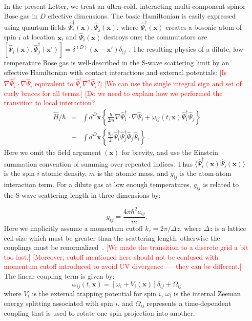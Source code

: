 \documentclass[aps,prl,twocolumn,showpacs,amsmath,amssymb,superscriptaddress]{revtex4-1}
\newcommand{\remark}[1]{\textcolor{red}{{[}#1{]}}}
\begin{document}
In the present Letter, we treat an ultra-cold,
interacting multi-component spinor Bose gas in $D$ effective dimensions.
The basic Hamiltonian is easily expressed using quantum fields
$\widehat{\Psi}_{i}^{\dagger}({\mathbf{x}}),\widehat{\Psi}_{j}({\mathbf{x}})$,
where $\widehat{\Psi}_{i}^{\dagger}({\mathbf{x}})$ creates a bosonic atom of spin $i$
at location $\mathbf{x}$, and $\widehat{\Psi}_{i}({\mathbf{x}})$ destroys one;
the commutators are
$[\widehat{\Psi}_{i}(\mathbf{x}),\widehat{\Psi}_{j}^{\dagger}(\mathbf{x}')] =
\delta^{(D)}(\mathbf{x}-\mathbf{x}')\delta_{ij}\,\,.$
The resulting physics of a dilute, low-temperature Bose gas
is well-described in the S-wave scattering limit by an effective Hamiltonian
with contact interactions and external potentials:
	\remark{Is $\nabla \widehat{\Psi}_{i}^{\dagger} \cdot \nabla \widehat{\Psi}_{i}$
	equivalent to $\widehat{\Psi}_{i}^{\dagger} \nabla^2 \widehat{\Psi}_{i}$?}
	\remark{We can use the single integral sign and set of curly braces for all terms.}
	\remark{Do we need to explain how we performed the transition to local interaction?}
\begin{eqnarray}
	\widehat{H}/\hbar & = & \int d^{D}{\mathbf{x}} \left\{
		\frac{\hbar}{2m}{\nabla} \widehat{\Psi}_{i}^{\dagger} \cdot {\nabla} \widehat{\Psi}_{i} +
		\omega_{ij}(t,{\mathbf{x}}) \widehat{\Psi}_{i}^{\dagger} \widehat{\Psi}_{j}
	\right\} \nonumber \\
	& + & \int d^{D}{\mathbf{x}} \left\{
		\frac{g_{ij}}{2} \widehat{\Psi}_{i}^{\dagger} \widehat{\Psi}_{j}^{\dagger}
		\widehat{\Psi}_{j} \widehat{\Psi}_{i}
	\right\} \,\,.
\end{eqnarray}
Here we omit the field argument $({\mathbf{x}})$ for brevity,
and use the Einstein summation convention of summing over repeated indices.
Thus $\langle \widehat{\Psi}_{i}^{\dagger}({\mathbf{x}}) \widehat{\Psi}_{i}({\mathbf{x}}) \rangle$
is the spin $i$ atomic density, $m$ is the atomic mass,
and $g_{ij}$ is the atom-atom interaction term.
For a dilute gas at low enough temperatures,
$g_{ij}$ is related to the S-wave scattering length in three dimensions by:

\begin{equation}
	g_{ij}=\frac{4\pi\hbar^{2}a_{ij}}{m}.
\end{equation}
Here we implicitly assume a momentum cutoff $k_{c}=2\pi/\Delta z$,
where $\Delta z$ is a lattice cell-size which must be greater than the scattering length,
otherwise the couplings must be renormalized~\cite{Sinatra2002}.
	\remark{We made the transition to a discrete grid a bit too fast.}
	\remark{Moreover, cutoff mentioned here should not be confused with momentum cutoff
	introduced to avoid UV divergence~--- they can be different.}
The linear coupling term is given by:
\begin{equation}
	\omega_{ij}(t,{\mathbf{x}}) = \left[
		\omega_{i}+V_{i} \left( \mathbf{x} \right)
	\right] \delta_{ij} + \Omega_{ij}
\end{equation}
where $V_{i}$ is the external trapping potential for spin $i$,
$\omega_{i}$ is the internal Zeeman energy splitting associated with spin $i$,
and $\Omega_{ij}$ represents a time-dependent coupling
that is used to rotate one spin projection into another.
\end{document}
